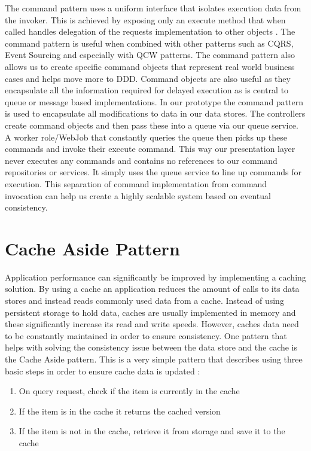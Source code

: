  The command pattern uses a uniform interface that isolates execution data from the invoker. This is achieved by exposing only an execute method that when called handles delegation of the requests implementation to other objects \cite{Gamma1994-ho}. The command pattern is useful when combined with other patterns such as CQRS, Event Sourcing and especially with QCW patterns. The command pattern also allows us to create specific command objects that represent real world business cases and helps move more to DDD. Command objects are also useful as they encapsulate all the information required for delayed execution \cite{Gamma1994-ho} as is central to queue or message based implementations. In our prototype the command pattern is used to encapsulate all modifications to data in our data stores. The controllers create command objects and then pass these into a queue via our queue service. A worker role/WebJob that constantly queries the queue then picks up these commands and invoke their execute command. This way our presentation layer never executes any commands and contains no references to our command repositories or services. It simply uses the queue service to line up commands for execution. This separation of command implementation from command invocation can help us create a highly scalable system based on eventual consistency.
 
 
 \section{Cache Aside Pattern}
  \label{sec:cache}
 Application performance can significantly be improved by implementing a caching solution. By using a cache an application reduces the amount of calls to its data stores and instead reads commonly used data from a cache. Instead of using persistent storage to hold data, caches are usually implemented in memory and these significantly increase its read and write speeds. However, caches data need to be constantly maintained in order to ensure consistency. One pattern that helps with solving the consistency issue between the data store and the cache is the Cache Aside pattern. This is a very simple pattern that describes using three basic steps in order to ensure cache data is updated \cite{Homer2014}:
 
    \begin{enumerate}
        \item On query request, check if the item is currently in the cache
        \item If the item is in the cache it returns the cached version
        \item If the item is not in the cache, retrieve it from storage and save it to the cache
   \end{enumerate}
   
